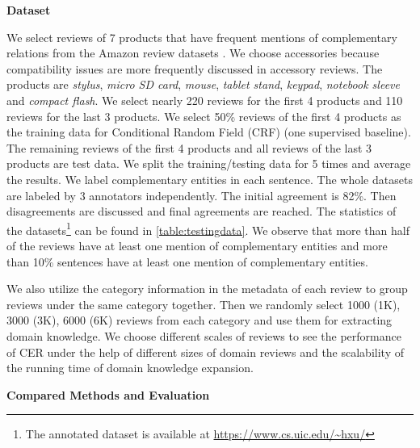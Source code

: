 \textbf{Dataset}

We select reviews of 7 products that have frequent mentions of complementary relations from the Amazon review datasets \cite{McAPanLes15}. We choose accessories because compatibility issues are more frequently discussed in accessory reviews. The products are \textit{stylus}, \textit{micro SD card}, \textit{mouse}, \textit{tablet stand}, \textit{keypad}, \textit{notebook sleeve} and \textit{compact flash}. We select nearly 220 reviews for the first 4 products and 110 reviews for the last 3 products. We select 50\% reviews of the first 4 products as the training data for Conditional Random Field (CRF) (one supervised baseline). The remaining reviews of the first 4 products and all reviews of the last 3 products are test data. We split the training/testing data for 5 times and average the results. We label complementary entities in each sentence. The whole datasets are labeled by 3 annotators independently. The initial agreement is 82\%. Then disagreements are discussed and final agreements are reached. The statistics of the datasets\footnote{The annotated dataset is available at \url{https://www.cs.uic.edu/~hxu/} } can be found in \ref{table:testingdata}. We observe that more than half of the reviews have at least one mention of complementary entities and more than 10\% sentences have at least one mention of complementary entities.

We also utilize the category information in the metadata of each review to group reviews under the same category together. Then we randomly select 1000 (1K), 3000 (3K), 6000 (6K) reviews from each category and use them for extracting domain knowledge. We choose different scales of reviews to see the performance of CER under the help of different sizes of domain reviews and the scalability of the running time of domain knowledge expansion.

\textbf{Compared Methods and Evaluation}

